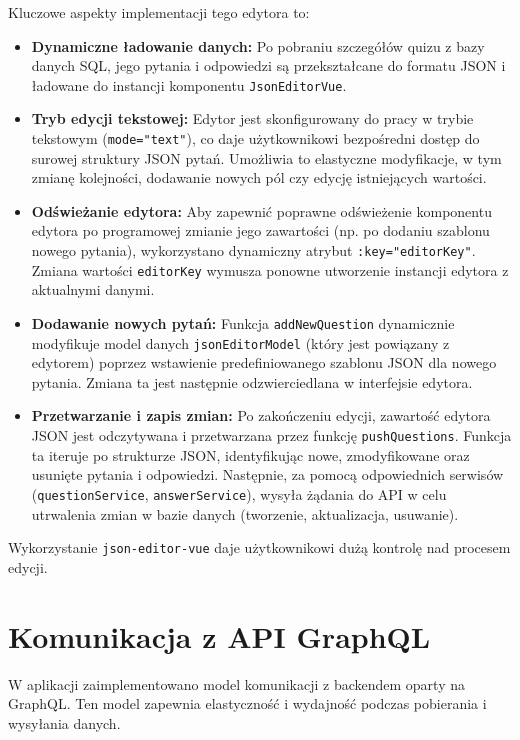 \documentclass{article}
\begin{document}
        Kluczowe aspekty implementacji tego edytora to:
        \begin{itemize}
          \item \textbf{Dynamiczne ładowanie danych:} Po pobraniu szczegółów quizu z bazy danych SQL, jego pytania i odpowiedzi są przekształcane do formatu JSON i ładowane do instancji komponentu \texttt{JsonEditorVue}.
          \item \textbf{Tryb edycji tekstowej:} Edytor jest skonfigurowany do pracy w trybie tekstowym (\texttt{mode="text"}), co daje użytkownikowi bezpośredni dostęp do surowej struktury JSON pytań. Umożliwia to elastyczne modyfikacje, w tym zmianę kolejności, dodawanie nowych pól czy edycję istniejących wartości.
          \item \textbf{Odświeżanie edytora:} Aby zapewnić poprawne odświeżenie komponentu edytora po programowej zmianie jego zawartości (np. po dodaniu szablonu nowego pytania), wykorzystano dynamiczny atrybut \texttt{:key="editorKey"}. Zmiana wartości \texttt{editorKey} wymusza ponowne utworzenie instancji edytora z aktualnymi danymi.
          \item \textbf{Dodawanie nowych pytań:} Funkcja \texttt{addNewQuestion} dynamicznie modyfikuje model danych \texttt{jsonEditorModel} (który jest powiązany z edytorem) poprzez wstawienie predefiniowanego szablonu JSON dla nowego pytania. Zmiana ta jest następnie odzwierciedlana w interfejsie edytora.
          \item \textbf{Przetwarzanie i zapis zmian:} Po zakończeniu edycji, zawartość edytora JSON jest odczytywana i przetwarzana przez funkcję \texttt{pushQuestions}. Funkcja ta iteruje po strukturze JSON, identyfikując nowe, zmodyfikowane oraz usunięte pytania i odpowiedzi. Następnie, za pomocą odpowiednich serwisów (\texttt{questionService}, \texttt{answerService}), wysyła żądania do API w celu utrwalenia zmian w bazie danych (tworzenie, aktualizacja, usuwanie).
        \end{itemize}
        Wykorzystanie \texttt{json-editor-vue} daje użytkownikowi dużą kontrolę nad procesem edycji.

        \section{Komunikacja z API GraphQL}
        W aplikacji zaimplementowano model komunikacji z backendem oparty na GraphQL. Ten model zapewnia elastyczność i wydajność podczas pobierania i wysyłania danych.
      
\end{document}
